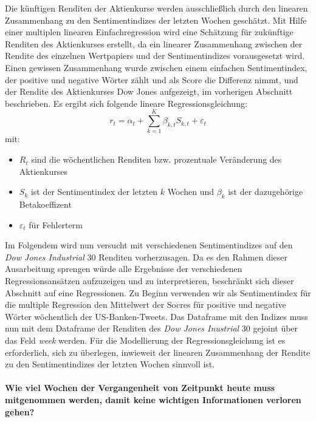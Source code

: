Die künftigen Renditen der Aktienkurse werden ausschließlich
durch den linearen Zusammenhang zu den Sentimentindizes der letzten Wochen geschätzt. Mit Hilfe einer multiplen linearen Einfachregression wird eine Schätzung für zukünftige Renditen des Aktienkurses erstellt, da ein linearer Zusammenhang zwischen der Rendite des einzelnen Wertpapiers und der Sentimentindizes vorausgesetzt wird. Einen gewissen Zusammenhang wurde zwischen einem einfachen Sentimentindex, der positive und negative Wörter zählt und als Score die Differenz nimmt, und der Rendite des Aktienkurses  Dow Jones aufgezeigt, im  vorherigen Abschnitt beschrieben. Es ergibt sich folgende lineare Regressionsgleichung:
\begin{equation}
r_{t}=\alpha_{t}+ \sum_{k=1}^{K} \beta_{k,t} S_{k,t}+\varepsilon_{t}
\end{equation}
mit:
\begin{itemize}
	\item  $R_{t}$ sind die wöchentlichen Renditen bzw. prozentuale Veränderung des Aktienkurses
	\item $S_{k}$ ist der Sentimentindex der letzten $k$ Wochen und $\beta_{k}$ ist der dazugehörige Betakoeffizent
	\item $\varepsilon_{t}$ für  Fehlerterm 
\end{itemize}
Im Folgendem wird nun versucht mit verschiedenen Sentimentindizes auf den \textit{Dow Jones Industrial} $30$ Renditen vorherzusagen. Da es den Rahmen dieser Ausarbeitung sprengen würde alle Ergebnisse der verschiedenen Regressionsansätzen aufzuzeigen und zu interpretieren, beschränkt sich dieser Abschnitt auf eine Regressionen. Zu Beginn verwenden wir als Sentimentindex für die multiple Regression den Mittelwert der Socres für positive und negative Wörter wöchentlich der US-Banken-Tweets. Das Dataframe mit den Indizes muss nun mit dem Dataframe der Renditen  des \textit{Dow Jones Inustrial} $30$ gejoint  über das Feld \textit{week} werden. Für die Modellierung der Regressionsgleichung ist es erforderlich, sich zu überlegen, inwieweit der linearen Zusammenhang der Rendite zu den Sentimentindizes der letzten Wochen sinnvoll ist.\\
\\
\textbf{Wie viel Wochen der Vergangenheit von Zeitpunkt heute muss mitgenommen werden, damit keine wichtigen Informationen verloren gehen?} 
\\
\\
